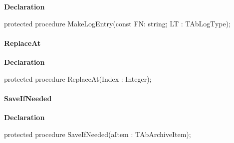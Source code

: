 \documentclass{report}
\newif\ifpdf
\begin{document}
\label{AbArcTyp.TAbArchive-MakeLogEntry}
\begin{list}{}{
\setlength{\itemindent}{0cm}
\setlength{\listparindent}{0cm}
\setlength{\leftmargin}{\evensidemargin}
\addtolength{\leftmargin}{\tmplength}
\settowidth{\labelsep}{X}
\addtolength{\leftmargin}{\labelsep}
\setlength{\labelwidth}{\tmplength}
}
\item[\textbf{Declaration}\hfill]
\ifpdf
\begin{flushleft}
\fi
\begin{ttfamily}
protected procedure MakeLogEntry(const FN: string; LT : TAbLogType);\end{ttfamily}

\ifpdf
\end{flushleft}
\fi

\end{list}
\paragraph*{ReplaceAt}\hspace*{\fill}

\label{AbArcTyp.TAbArchive-ReplaceAt}
\begin{list}{}{
\setlength{\itemindent}{0cm}
\setlength{\listparindent}{0cm}
\setlength{\leftmargin}{\evensidemargin}
\addtolength{\leftmargin}{\tmplength}
\settowidth{\labelsep}{X}
\addtolength{\leftmargin}{\labelsep}
\setlength{\labelwidth}{\tmplength}
}
\item[\textbf{Declaration}\hfill]
\ifpdf
\begin{flushleft}
\fi
\begin{ttfamily}
protected procedure ReplaceAt(Index : Integer);\end{ttfamily}

\ifpdf
\end{flushleft}
\fi

\end{list}
\paragraph*{SaveIfNeeded}\hspace*{\fill}

\label{AbArcTyp.TAbArchive-SaveIfNeeded}
\begin{list}{}{
\setlength{\itemindent}{0cm}
\setlength{\listparindent}{0cm}
\setlength{\leftmargin}{\evensidemargin}
\addtolength{\leftmargin}{\tmplength}
\settowidth{\labelsep}{X}
\addtolength{\leftmargin}{\labelsep}
\setlength{\labelwidth}{\tmplength}
}
\item[\textbf{Declaration}\hfill]
\ifpdf
\begin{flushleft}
\fi
\begin{ttfamily}
protected procedure SaveIfNeeded(aItem : TAbArchiveItem);\end{ttfamily}

\ifpdf
\end{flushleft}
\fi

\end{list}
\end{document}
